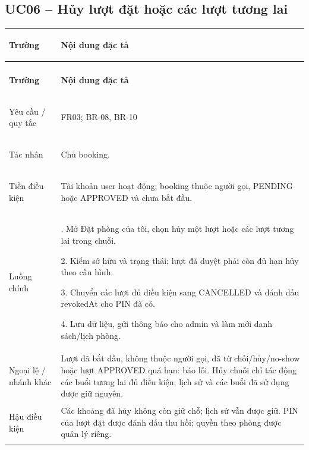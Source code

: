 \subsection{UC06 -- Hủy lượt đặt hoặc các lượt tương lai}\label{tab:uc06}
{\small\renewcommand{\arraystretch}{1.06}
\setlength{\tabcolsep}{6pt}\setlength{\extrarowheight}{2pt}
\renewcommand{\theHtable}{uc.\arabic{subsection}}\addtocounter{table}{-1}
\begin{longtable}{|>{\bfseries\raggedright\arraybackslash}p{3cm}|>{\raggedright\arraybackslash}p{\dimexpr\textwidth-3cm-4\tabcolsep-3\arrayrulewidth\relax}|}
\hline
\textbf{Trường} & \textbf{Nội dung đặc tả}\\\hline
\endfirsthead
\multicolumn{2}{r}{\small\itshape UC06 (tiếp)}\\
\hline
\textbf{Trường} & \textbf{Nội dung đặc tả}\\\hline
\endhead
\endlastfoot
Yêu cầu / quy tắc & FR03; BR-08, BR-10\\*\hline
Tác nhân & Chủ booking.\\*\hline
Tiền điều kiện & Tài khoản user hoạt động; booking thuộc người gọi, PENDING hoặc APPROVED và chưa bắt đầu.\\*\hline
Luồng chính & 1. Mở Đặt phòng của tôi, chọn hủy một lượt hoặc các lượt tương lai trong chuỗi.\par
2. Kiểm sở hữu và trạng thái; lượt đã duyệt phải còn đủ hạn hủy theo cấu hình.\par
3. Chuyển các lượt đủ điều kiện sang CANCELLED và đánh dấu revokedAt cho PIN đã có.\par
4. Lưu dữ liệu, gửi thông báo cho admin và làm mới danh sách/lịch phòng.\\\hline
Ngoại lệ / nhánh khác & Lượt đã bắt đầu, không thuộc người gọi, đã từ chối/hủy/no-show hoặc lượt APPROVED quá hạn: báo lỗi. Hủy chuỗi chỉ tác động các buổi tương lai đủ điều kiện; lịch sử và các buổi đã sử dụng được giữ nguyên.\\\hline
Hậu điều kiện & Các khoảng đã hủy không còn giữ chỗ; lịch sử vẫn được giữ. PIN của lượt đặt được đánh dấu thu hồi; quyền theo phòng được quản lý riêng.\\\hline
\end{longtable}}

